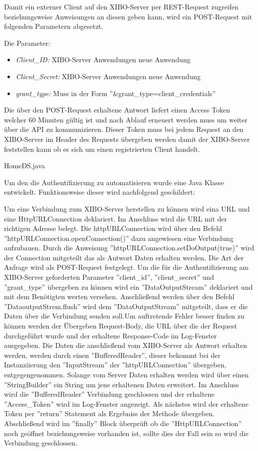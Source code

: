 Damit ein externer Client auf den XIBO-Server per REST-Request zugreifen beziehungsweise Anweisungen an diesen geben kann, wird ein POST-Request mit folgenden Parametern abgesetzt.

Die Parameter: 
\begin{itemize}
	\item {\em Client\_ID:} XIBO-Server Anwendungen neue Anwendung
	\item {\em Client\_Secret:}  XIBO-Server Anwendungen neue Anwendung
	\item{\em grant\_type:} Muss in der Form ''&grant\_type=client\_credentials''
\end{itemize}

Die über den POST-Request erhaltene Antwort liefert einen Access Token welcher 60 Minuten gültig ist und nach Ablauf erneuert werden muss um weiter über die API zu kommunizieren.
Dieser Token muss bei jedem Request an den XIBO-Server im Header des Requests übergeben werden damit der XIBO-Server feststellen kann ob es sich um einen registrierten Client handelt.

HomeDS\HomeDsBackend\src\main\java\at\htl\utils\AuthentificationHandler.java

Um den die Authentifizierung zu automatisieren wurde eine Java Klasse entwickelt. Funktionsweise dieser wird nachfolgend geschildert: 

Um eine Verbindung zum XIBO-Server herstellen zu können wird eina URL und eine HttpURLConnection deklariert. Im Anschluss wird die URL mit der richtigen Adresse belegt. Die httpURLConnection wird über den Befehl ''httpURLConnection.openConnection()'' dazu angewiesen eine Verbindung aufzubauen. Durch die Anweisung ''httpURLConnection.setDoOutput(true)'' wird der Connection mitgeteilt das als Antwort Daten erhalten werden. Die Art der Anfrage wird als POST-Request festgelegt. Um die für die Authentifizierung am XIBO-Server geforderten Parameter ''client\_id'', ''client\_secret'' und ''grant\_type'' übergeben zu können wird ein ''DataOutputStream'' deklariert und mit dem Benötigten werten versehen. Anschließend werden über den Befehl  ''DataoutputStrem.flush'' wird dem ''DataOutputStream'' mitgeteilt, dass er die Daten über die Verbindung senden soll.Um auftretende Fehler besser finden zu können werden der Übergeben Request-Body, die URL über die der Request durchgeführt wurde und der erhaltene Response-Code im Log-Fenster ausgegeben. Die Daten die anschließend vom XIBO-Server als Antwort erhalten werden, werden durch einen ''BufferedReader'', dieser bekommt bei der Instanziierung den ''InputStream'' der ''httpURLConnection'' übergeben, entgegengenommen. Solange vom Server Daten erhalten werden wird über einen ''StringBuilder'' ein String um jene erhaltenen Daten erweitert. Im Anschluss wird die ''BufferedReader'' Verbindung geschlossen und der erhaltene ''Access\_Token'' wird im Log-Fenster angezeigt. Als nächstes wird der erhaltene Token per ''return'' Statement als Ergebniss der Methode übergeben. Abschließend wird im ''finally'' Block überprüft ob die ''HttpURLConnection'' noch geöffnet beziehungsweise vorhanden ist, sollte dies der Fall sein so wird die Verbindung geschlossen.







